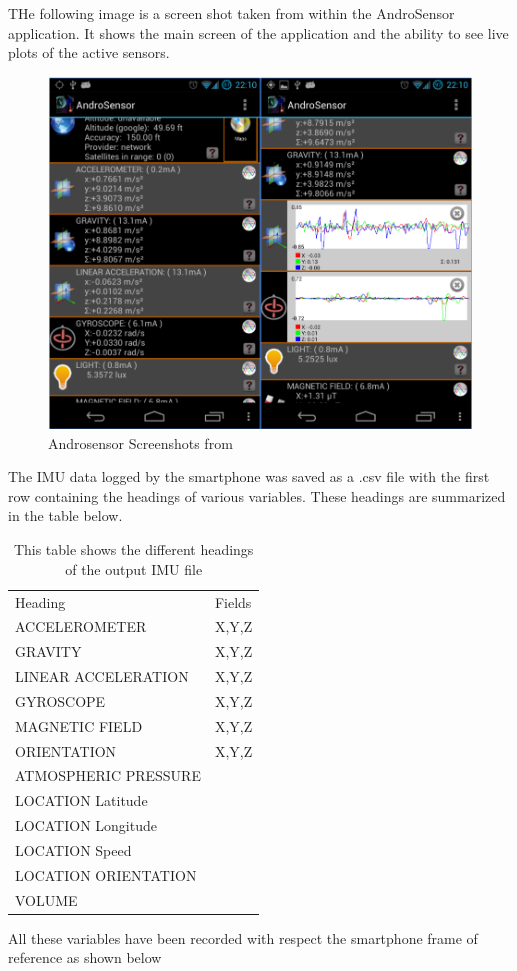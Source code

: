 THe following image is a screen shot taken from within the AndroSensor application. It shows the main screen of the application and the ability to see live plots of the active sensors.

\begin{figure}[!ht] 
\captionsetup{width=0.5\linewidth, font=small}  
\includegraphics[width=0.5\linewidth]{figures/as.png}
\caption{Androsensor Screenshots from \cite{androsensor}}
\label{fig:as}
\end{figure}

The IMU data logged by the smartphone was saved as a .csv file with the first row containing the headings of various variables. These headings are summarized in the table below.

\begin{table}
\centering
\caption{This table shows the different headings of the output IMU file}
\label{IMU Headings}
\begin{tabular}{ll}
Heading               & Fields  \\
ACCELEROMETER       & X,Y,Z  \\
GRAVITY              & X,Y,Z \\
LINEAR ACCELERATION  & X,Y,Z\\
GYROSCOPE            & X,Y,Z \\
MAGNETIC FIELD       &  X,Y,Z\\
ORIENTATION          &  X,Y,Z\\
ATMOSPHERIC PRESSURE  &      \\
LOCATION Latitude     &       \\
LOCATION Longitude    &       \\
LOCATION Speed        &       \\
LOCATION ORIENTATION  &       \\
VOLUME
\end{tabular}
\end{table}

All these variables have been recorded with respect the smartphone frame of reference as shown below

